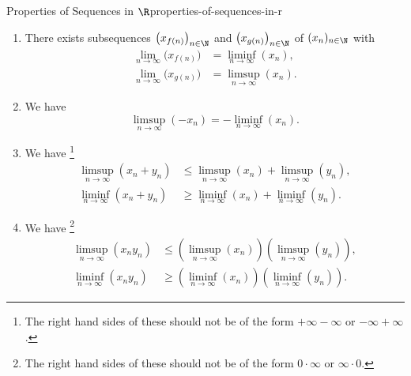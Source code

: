 \begin{proposition}{Properties of Sequences in $\R$}{properties-of-sequences-in-r}
\begin{enumerate}
\begin{enumerate}
\begin{align*}
                    \end{align*}
            \end{enumerate}
        \item\label{properties-of-sequences-in-r-interaction-with-subsequences}There exists subsequences $\big(x_{f(n)}\big)_{n\in\N}$ and $\big(x_{g(n)}\big)_{n\in\N}$ of $(x_{n})_{n\in\N}$ with
            \begin{align*}
                \lim_{n\to\infty}\big(x_{f(n)}\big) &= \liminf_{n\to\infty}(x_{n}),\\%
                \lim_{n\to\infty}\big(x_{g(n)}\big) &= \limsup_{n\to\infty}(x_{n}).%
            \end{align*}
        \item\label{properties-of-sequences-in-r-subtraction}We have
            \[
                \limsup_{n\to\infty}(-x_{n})
                =
                -\liminf_{n\to\infty}(x_{n}).
            \]%
        \item\label{properties-of-sequences-in-r-addition}We have%
            \footnote{%
                The right hand sides of these should not be of the form $+\infty-\infty$ or $-\infty+\infty$.
            }%
            \begin{align*}
                \limsup_{n\to\infty}(x_{n}+y_{n}) &\leq \limsup_{n\to\infty}(x_{n})+\limsup_{n\to\infty}(y_{n}),\\
                \liminf_{n\to\infty}(x_{n}+y_{n}) &\geq \liminf_{n\to\infty}(x_{n})+\liminf_{n\to\infty}(y_{n}).
            \end{align*}
        \item\label{properties-of-sequences-in-r-multiplication-1}We have%
            \footnote{%
                The right hand sides of these should not be of the form $0\cdot\infty$ or $\infty\cdot0$.
            }%
            \begin{align*}
                \limsup_{n\to\infty}(x_{n}y_{n}) &\leq \left(\limsup_{n\to\infty}(x_{n})\right)\left(\limsup_{n\to\infty}(y_{n})\right),\\
                \liminf_{n\to\infty}(x_{n}y_{n}) &\geq \left(\liminf_{n\to\infty}(x_{n})\right)\left(\liminf_{n\to\infty}(y_{n})\right).
            \end{align*}

\end{enumerate}
\end{proposition}
